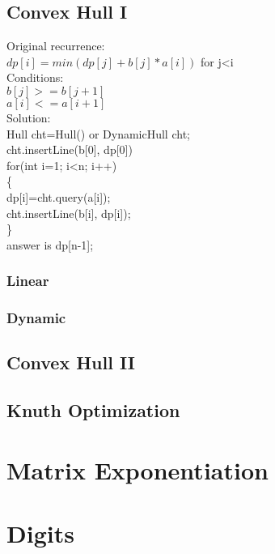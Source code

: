 \documentclass[10pt,a4paper]{report}
\newcommand\tab[1][1cm]{\hspace*{#1}}
\begin{document}
		\subsection{Convex Hull I}
			Original recurrence:\\
			\tab $dp[i]=min(dp[j]+b[j]*a[i])$ for j<i\\
			Conditions:\\
			\tab $b[j]>=b[j+1]$\\
			\tab $a[i]<=a[i+1]$\\
			Solution:\\
			Hull cht=Hull() or DynamicHull cht;\\
			cht.insertLine(b[0], dp[0])\\
			for(int i=1; i<n; i++)\\
			\{\\
				\tab dp[i]=cht.query(a[i]);\\
				\tab cht.insertLine(b[i], dp[i]);\\
			\}\\
			answer is dp[n-1];

			\subsubsection{Linear}
				
			\newpage
			\subsubsection{Dynamic}
				
		\subsection{Convex Hull II}
		\subsection{Knuth Optimization}
	\newpage
	\section{Matrix Exponentiation}
		
	\newpage
	\section{Digits}
		
	\newpage
\end{document}
